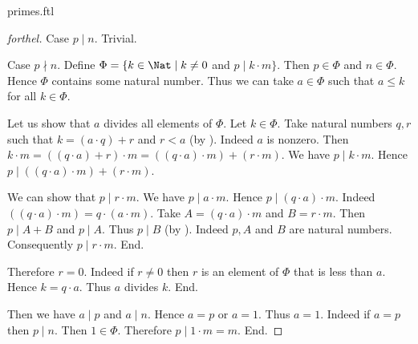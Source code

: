 \documentclass{naproche-library}
\begin{document}
\begin{smodule}[title=Prime Numbers]{primes.ftl}
\begin{proof}[forthel]
  Case $p \mid n$. Trivial.

  Case $p \nmid n$.
    Define $\Phi = \{ k \in \Nat \mid k \neq 0$ and $p \mid k \cdot m \}$.
    Then $p \in \Phi$ and $n \in \Phi$.
    Hence $\Phi$ contains some natural number.
    Thus we can take $a \in \Phi$ such that $a \leq k$ for all $k \in \Phi$.

    Let us show that $a$ divides all elements of $\Phi$.
      Let $k \in \Phi$.
      Take natural numbers $q, r$ such that $k = (a \cdot q) + r$ and $r < a$ (by ).
      Indeed $a$ is nonzero.
      Then $k \cdot m
        = ((q \cdot a) + r) \cdot m
        = ((q \cdot a) \cdot m) + (r \cdot m)$.
      We have $p \mid k \cdot m$.
      Hence $p \mid ((q \cdot a) \cdot m) + (r \cdot m)$.

      We can show that $p \mid r \cdot m$.
        We have $p \mid a \cdot m$.
        Hence $p \mid (q \cdot a) \cdot m$.
        Indeed $((q \cdot a) \cdot m) = q \cdot (a \cdot m)$. %
        Take $A = (q \cdot a) \cdot m$ and $B = r \cdot m$. %
        Then $p \mid A + B$ and $p \mid A$.
        Thus $p \mid B$ (by ).
        Indeed $p, A$ and $B$ are natural numbers.
        Consequently $p \mid r \cdot m$.
      End.

      Therefore $r = 0$.
      Indeed if $r \neq 0$ then $r$ is an element of $\Phi$ that is less than $a$.
      Hence $k = q \cdot a$.
      Thus $a$ divides $k$.
    End.

    Then we have $a \mid p$ and $a \mid n$.
    Hence $a = p$ or $a = 1$.
    Thus $a = 1$.
    Indeed if $a = p$ then $p \mid n$.
    Then $1 \in \Phi$.
    Therefore $p \mid 1 \cdot m = m$.
  End.
\end{proof}
\end{smodule}
\end{document}
